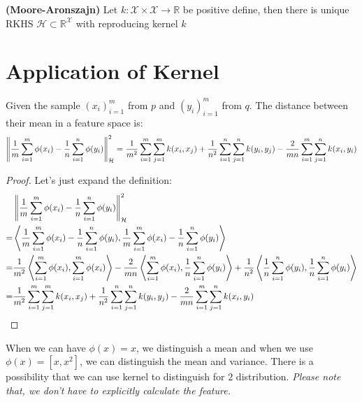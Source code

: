 \begin{theorem}{\textbf{(Moore-Aronszajn)}}
    Let $k:\mathcal{X}\times\mathcal{X}\rightarrow \mathbb{R}$ be positive define, then there is unique RKHS $\mathcal{H}\subset \mathbb{R}^{ \mathcal{X}}$ with reproducing kernel $k$
\end{theorem}


\section{Application of Kernel}

\begin{proposition}
    Given the sample $(x_i)^m_{i=1}$ from $p$ and $(y_i)^m_{i=1}$ from $q$. The distance between their mean in a feature space is:
    \begin{equation*}
        \left\lVert \frac{1}{m}\sum^m_{i=1}\phi(x_i) - \frac{1}{n}\sum^n_{i=1}\phi(y_i) \right\rVert^2_\mathcal{H} = 
        \frac{1}{m^2}\sum^m_{i=1}\sum^m_{j=1}k(x_i,x_j) + \frac{1}{n^2}\sum^n_{i=1}\sum^n_{j=1}k(y_i, y_j) - \frac{2}{mn}\sum^m_{i=1}\sum^n_{j=1}k(x_i, y_i)
    \end{equation*}
\end{proposition}
\begin{proof}
    Let's just expand the definition:
    \begin{equation*}
    \begin{aligned}
        &\left\lVert \frac{1}{m}\sum^m_{i=1}\phi(x_i) - \frac{1}{n}\sum^n_{i=1}\phi(y_i) \right\rVert^2_\mathcal{H} \\ 
        =& \left\langle \frac{1}{m}\sum^m_{i=1}\phi(x_i) - \frac{1}{n}\sum^n_{i=1}\phi(y_i), \frac{1}{m}\sum^m_{i=1}\phi(x_i) - \frac{1}{n}\sum^n_{i=1}\phi(y_i) \right\rangle \\
        =&\frac{1}{m^2}\left\langle \sum^m_{i=1}\phi(x_i), \sum^m_{i=1}\phi(x_i) \right\rangle - \frac{2}{mn}\left\langle \sum^m_{i=1}\phi(x_i), \frac{1}{n}\sum^n_{i=1}\phi(y_i) \right\rangle + \frac{1}{n^2}\left\langle \frac{1}{n}\sum^n_{i=1}\phi(y_i), \frac{1}{n}\sum^n_{i=1}\phi(y_i) \right\rangle \\
        =& \frac{1}{m^2}\sum^m_{i=1}\sum^m_{j=1}k(x_i,x_j) + \frac{1}{n^2}\sum^n_{i=1}\sum^n_{j=1}k(y_i, y_j) - \frac{2}{mn}\sum^m_{i=1}\sum^n_{j=1}k(x_i, y_i)
    \end{aligned}
    \end{equation*}
\end{proof}
\begin{remark}
    When we can have $\phi(x) = x$, we distinguish a mean and when we use $\phi(x) = [x, x^2]$, we can distinguish the mean and variance. There is a possibility that we can use kernel to distinguish for $2$ distribution. \emph{Please note that, we don't have to explicitly calculate the feature.}
\end{remark}

